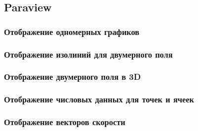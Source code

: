 \subsection{Paraview}

\subsubsection{Отображение одномерных графиков}
\label{sec:paraview-1d}

\subsubsection{Отображение изолиний для двумерного поля}
\label{sec:paraview-isolines}

\subsubsection{Отображение двумерного поля в 3D}
\label{sec:paraview-2d}

\subsubsection{Отображение числовых данных для точек и ячеек}
\label{sec:paraview-show-data}

\subsubsection{Отображение векторов скорости}
\label{sec:paraview-glyph}
